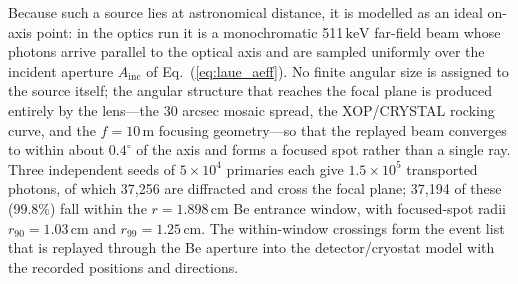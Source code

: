 \documentclass[11pt]{article}
\newcommand{\keV}{\ensuremath{\,\mathrm{keV}}}
\begin{document}
Because such a source lies at astronomical distance, it is modelled as an ideal
on-axis point: in the optics run it is a monochromatic 511\keV{} far-field beam
whose photons arrive parallel to the optical axis and are sampled uniformly over
the incident aperture $A_{\mathrm{inc}}$ of Eq.~(\ref{eq:laue_aeff}). No finite
angular size is assigned to the source itself; the angular structure that reaches
the focal plane is produced entirely by the lens---the 30 arcsec mosaic spread,
the XOP/CRYSTAL rocking curve, and the $f=10\,\mathrm{m}$ focusing geometry---so
that the replayed beam converges to within about $0.4^\circ$ of the axis and
forms a focused spot rather than a single ray. Three independent seeds of
$5\times10^{4}$ primaries each give $1.5\times10^{5}$ transported photons, of
which 37,256 are diffracted and cross the focal plane; 37,194 of these (99.8\%)
fall within the $r=1.898\,\mathrm{cm}$ Be entrance window, with focused-spot
radii $r_{90}=1.03\,\mathrm{cm}$ and $r_{99}=1.25\,\mathrm{cm}$. The
within-window crossings form the event list that is replayed through the Be
aperture into the detector/cryostat model with the recorded positions and
directions.
\end{document}
